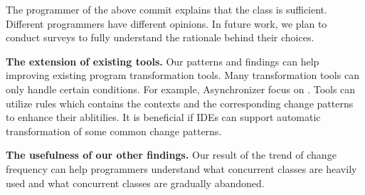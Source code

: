 The programmer of the above commit explains that the  class is sufficient. Different programmers have different opinions. In future work, we plan to conduct surveys to fully understand the rationale behind their choices.

\noindent
\textbf{The extension of existing tools.} Our patterns and findings can help improving existing program transformation tools. Many transformation tools can only handle certain conditions. For example, Asynchronizer \cite{conf/sigsoft/LinRD14} focus on . Tools can utilize rules which contains the contexts and the corresponding change patterns to enhance their ablitilies. It is beneficial if IDEs can support automatic transformation of some common change patterns.

\noindent
\textbf{The usefulness of our other findings.} Our result of the trend of change frequency can help programmers understand what concurrent classes are heavily used and what concurrent classes are gradually abandoned.%
